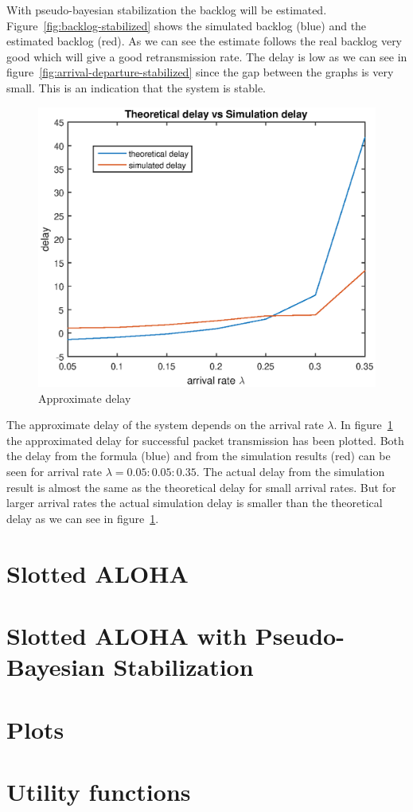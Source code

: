 \documentclass{article}
\begin{document}
With pseudo-bayesian stabilization the backlog will be estimated. Figure~\ref{fig:backlog-stabilized} shows the simulated backlog (blue) and the estimated backlog (red). As we can see the estimate follows the real backlog very good which will give a good retransmission rate. The delay is low as we can see in figure~\ref{fig:arrival-departure-stabilized} since the gap between the graphs is very small. This is an indication that the system is stable.

\begin{figure}[h]
  \centering
  \includegraphics[width=.5\textwidth]{figures/approximate-delay.eps}
  \caption{Approximate delay}
  \label{fig:approximate-delay}
\end{figure}

The approximate delay of the system depends on the arrival rate $\lambda$. In figure~\ref{fig:approximate-delay} the approximated delay for successful packet transmission has been plotted. Both the delay from the formula (blue) and from the simulation results (red) can be seen for arrival rate $\lambda = 0.05:0.05:0.35$. The actual delay from the simulation result is almost the same as the theoretical delay for small arrival rates. But for larger arrival rates the actual simulation delay is smaller than the theoretical delay as we can see in figure~\ref{fig:approximate-delay}. 

\newpage
\appendix
\section{Slotted ALOHA}


\newpage
\section{Slotted ALOHA with Pseudo-Bayesian Stabilization}


\newpage
\section{Plots}


\section{Utility functions}


\end{document}
